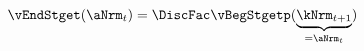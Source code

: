   \begin{equation}\begin{gathered}\begin{aligned}
\vEndStget(\aNrm_{\stge}) & = \DiscFac \vBegStgetp(\underbrace{\kNrm_{\stge+1}}_{=\aNrm_{\stge}}) \label{eq:vEndStget}
      \end{aligned}\end{gathered}\end{equation}
